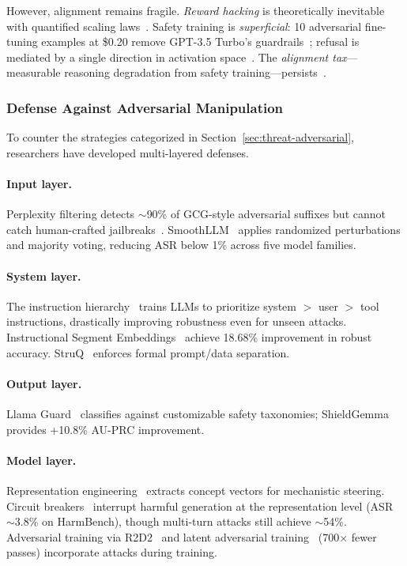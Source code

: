 However, alignment remains fragile. \emph{Reward hacking} is theoretically inevitable~\cite{skalse2022rewardhacking} with quantified scaling laws~\cite{gao2023scalinglaws}. Safety training is \emph{superficial}: 10 adversarial fine-tuning examples at \$0.20 remove GPT-3.5 Turbo's guardrails~\cite{qi2024finetuning}; refusal is mediated by a single direction in activation space~\cite{arditi2024refusal}. The \emph{alignment tax}---measurable reasoning degradation from safety training---persists~\cite{huang2025safetytax}.


\subsubsection{Defense Against Adversarial Manipulation}
\label{sec:defense}

To counter the strategies categorized in Section~\ref{sec:threat-adversarial}, researchers have developed multi-layered defenses.

\paragraph{Input layer.}
Perplexity filtering detects $\sim$90\% of GCG-style adversarial suffixes but cannot catch human-crafted jailbreaks~\cite{alon2023perplexity}. SmoothLLM~\cite{robey2023smoothllm} applies randomized perturbations and majority voting, reducing ASR below 1\% across five model families.

\paragraph{System layer.}
The instruction hierarchy~\cite{wallace2024hierarchy} trains LLMs to prioritize system $>$ user $>$ tool instructions, drastically improving robustness even for unseen attacks. Instructional Segment Embeddings~\cite{wu2025ise} achieve 18.68\% improvement in robust accuracy. StruQ~\cite{chen2025struq} enforces formal prompt/data separation.

\paragraph{Output layer.}
Llama Guard~\cite{inan2023llamaguard} classifies against customizable safety taxonomies; ShieldGemma~\cite{zeng2024shieldgemma} provides +10.8\% AU-PRC improvement.

\paragraph{Model layer.}
Representation engineering~\cite{zou2023repe} extracts concept vectors for mechanistic steering. Circuit breakers~\cite{zou2024circuitbreakers} interrupt harmful generation at the representation level (ASR $\sim$3.8\% on HarmBench), though multi-turn attacks still achieve $\sim$54\%. Adversarial training via R2D2~\cite{mazeika2024harmbench} and latent adversarial training~\cite{sheshadri2024lat} (700$\times$ fewer passes) incorporate attacks during training.

